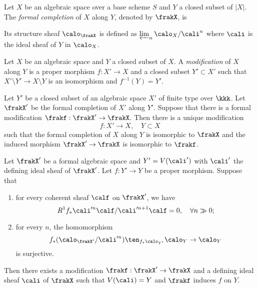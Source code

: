     \begin{definition}\label{def:formal_completion_of_algebraic_space}
        Let \(X\) be an algebraic space over a base scheme \(S\) and \(Y\) a closed subset of \(|X|\).
        The \emph{formal completion} of \(X\) along \(Y\), denoted by \(\frakX\), is 

        Its structure sheaf \(\calo_{\frakX}\) is defined as \(\varprojlim_n \calo_X / \cali^n\) where \(\cali\) is the ideal sheaf of \(Y\) in \(\calo_X\).
    \end{definition}

    \begin{definition}\label{def:modification}
        Let \(X\) be an algebraic space and \(Y\) a closed subset of \(X\).
        A \emph{modification} of \(X\) along \(Y\) is a proper morphism \(f: X' \to X\) and a closed subset \(Y' \subset X'\) such that \(X'\setminus Y' \to X \setminus Y\) is an isomorphism and \(f^{-1}(Y) = Y'\).
    \end{definition}

    \begin{theorem}\label{thm:Artin_existence_of_modification}
        Let \(Y'\) be a closed subset of an algebraic space \(X'\) of finite type over \(\kkk\).
        Let \(\frakX'\) be the formal completion of \(X'\) along \(Y'\).
        Suppose that there is a formal modification \(\frakf: \frakX' \to \frakX\).
        Then there is a unique modification 
        \[ f: X' \to X, \quad Y \subset X \]
        such that the formal completion of \(X\) along \(Y\) is isomorphic to \(\frakX\) and the induced morphism \(\frakX' \to \frakX\) is isomorphic to \(\frakf\).
    \end{theorem}

    \begin{theorem}\label{thm:Artin_higher_direct_image_and_modification}
        Let \(\frakX'\) be a formal algebraic space and \(Y' = V(\cali')\) with \(\cali'\) the defining ideal sheaf of \(\frakX'\).
        Let \(f:Y' \to Y\) be a proper morphism.
        Suppose that 
        \begin{enumerate}
            \item for every coherent sheaf \(\calf\) on \(\frakX'\), we have 
                \[ R^1f_* \cali'^n\calf/\cali'^{n+1}\calf = 0, \quad \forall n \gg 0; \]
            \item for every \(n\), the homomorphism 
                \[ f_*(\calo_{\frakX'} / \cali'^{n})\ten_{f_*\calo_{Y'}} \calo_Y \to \calo_Y \]
                is surjective.
        \end{enumerate}
        Then there exists a modification \(\frakf: \frakX' \to \frakX\) and a defining ideal sheaf \(\cali\) of \(\frakX\) such that \(V(\cali) = Y\) and \(\frakf\) induces \(f\) on \(Y\).
    \end{theorem}

